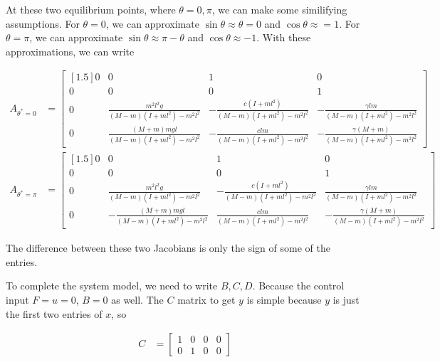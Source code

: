 \documentclass[11pt]{article}
\theoremstyle{definition}
\begin{document}
\begin{enumerate}
\begin{enumerate}
        At these two equilibrium points, where $\theta = 0, \pi$, we can make some similifying assumptions.  For $\theta = 0$, we can approximate $\sin\theta \approx \theta = 0$ and $\cos\theta \approx = 1$.  For $\theta = \pi$, we can approximate $\sin\theta \approx \pi - \theta$ and $\cos\theta \approx -1$.  With these approximations, we can write 

        \begin{align}
             A_{\theta^* = 0} &= \begin{bmatrix}[1.5]
                0 & 0 & 1 & 0 \\
                0 & 0 & 0 & 1 \\
                0 & \frac{m^2 l^2 g}{(M - m)(I + ml^2) - m^2 l^2} & -\frac{c (I + ml^2)}{(M - m)(I + ml^2) - m^2 l^2} & -\frac{\gamma lm}{(M - m)(I + ml^2) - m^2 l^2} \\
                0 & \frac{(M + m)mgl}{(M - m)(I + ml^2) - m^2 l^2} & -\frac{clm}{(M - m)(I + ml^2) - m^2 l^2} & -\frac{\gamma (M + m)}{(M - m)(I + ml^2) - m^2 l^2}
             \end{bmatrix} \\
            A_{\theta^* = \pi} &= \begin{bmatrix}[1.5]
                0 & 0 & 1 & 0 \\
                0 & 0 & 0 & 1 \\
                0 & \frac{m^2 l^2 g}{(M - m)(I + ml^2) - m^2 l^2} & -\frac{c (I + ml^2)}{(M - m)(I + ml^2) - m^2 l^2} & \frac{\gamma lm}{(M - m)(I + ml^2) - m^2 l^2} \\
                0 & -\frac{(M + m)mgl}{(M - m)(I + ml^2) - m^2 l^2} & \frac{clm}{(M - m)(I + ml^2) - m^2 l^2} & -\frac{\gamma (M + m)}{(M - m)(I + ml^2) - m^2 l^2}
             \end{bmatrix}
        \end{align}

        The difference between these two Jacobians is only the sign of some of the entries.

        To complete the system model, we need to write $B, C, D$.  Because the control input $F = u = 0$, $B = 0$ as well.  The $C$ matrix to get $y$ is simple because $y$ is just the first two entries of $x$, so 

        \begin{align}
            C &= \begin{bmatrix} 1 & 0 & 0 & 0 \\ 0 & 1 & 0 & 0 \end{bmatrix}
        \end{align}


\end{enumerate}
\end{enumerate}
\end{document}
